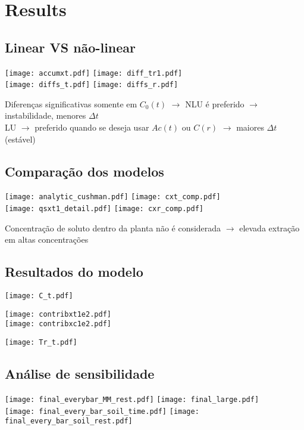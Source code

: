 \section{Results}

\subsection{Linear VS não-linear}
\begin{frame}
  \texttt{[image: accumxt.pdf]}
  \texttt{[image: diff\_tr1.pdf]}\\[.5cm]
  
  \texttt{[image: diffs\_t.pdf]}
  \texttt{[image: diffs\_r.pdf]}

  Diferenças significativas somente em $C_0(t)$ $\rightarrow$ NLU é preferido $\rightarrow$ instabilidade, menores $\Delta t$\\
  LU $\rightarrow$ preferido quando se deseja usar $Ac(t)$ ou $C(r)$ $\rightarrow$ maiores $\Delta t$ (estável)
\end{frame}

\subsection{Comparação dos modelos}
\begin{frame}
  \texttt{[image: analytic\_cushman.pdf]}
  \texttt{[image: cxt\_comp.pdf]}\\[.5cm]
  \texttt{[image: qsxt1\_detail.pdf]}
  \texttt{[image: cxr\_comp.pdf]}

  Concentração de soluto dentro da planta não é considerada $\rightarrow$ elevada extração em altas concentrações
\end{frame}

\subsection{Resultados do modelo}
\begin{frame}
  \texttt{[image: C\_t.pdf]}
\end{frame}
\begin{frame}
  \texttt{[image: contribxt1e2.pdf]}\\[.5cm]
  \texttt{[image: contribxc1e2.pdf]}
\end{frame}
\begin{frame}
  \texttt{[image: Tr\_t.pdf]}
\end{frame}

\subsection{Análise de sensibilidade}
\begin{frame}
  \texttt{[image: final\_everybar\_MM\_rest.pdf]}
  \texttt{[image: final\_large.pdf]}\\[.5cm]
  \texttt{[image: final\_every\_bar\_soil\_time.pdf]}
  \texttt{[image: final\_every\_bar\_soil\_rest.pdf]}


\end{frame}
